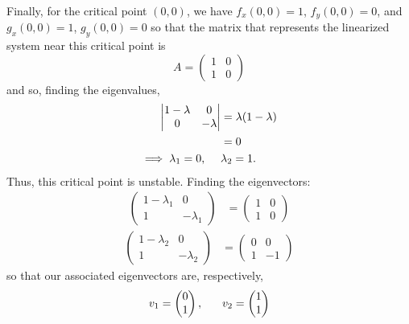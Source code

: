 \documentclass{article}
\begin{document}
\begin{itemize}
\begin{itemize}
        Finally, for the critical point $(0,0)$, we have $f_x(0,0) = 1$, $f_y(0,0) = 0$, and $g_x(0,0) = 1$, $g_y(0,0) = 0$ so that the matrix that represents the linearized system near this critical point is
        \[A = \begin{pmatrix}
            1 & 0\\
            1 & 0
        \end{pmatrix}\]
        and so, finding the eigenvalues,
        \begin{align*}
            \left|\begin{matrix}
                1 - \lambda & 0\\
                0 & -\lambda
            \end{matrix}\right| &= \lambda(1 - \lambda)\\
            &= 0\\
            \implies \lambda_1 = 0, \hspace{0.5cm} &\lambda_2 = 1.
        \end{align*}
        Thus, this critical point is unstable. Finding the eigenvectors:
        \begin{align*}
            \begin{pmatrix}
                1 - \lambda_1 & 0\\
                1 & -\lambda_1
            \end{pmatrix} &= \begin{pmatrix}
                1 & 0\\
                1 & 0
            \end{pmatrix}
        \end{align*}
        \begin{align*}
            \begin{pmatrix}
                1 -\lambda_2 & 0\\
                1 & -\lambda_2
            \end{pmatrix} &= \begin{pmatrix}
                0 & 0\\
                1 & -1
            \end{pmatrix}
        \end{align*}
        so that our associated eigenvectors are, respectively,
        \[v_1 = \begin{pmatrix}
            0\\
            1
        \end{pmatrix}, \hspace{0.6cm} v_2 = \begin{pmatrix}
            1\\
            1
        \end{pmatrix}\]
       

\end{itemize}
\end{itemize}
\end{document}
